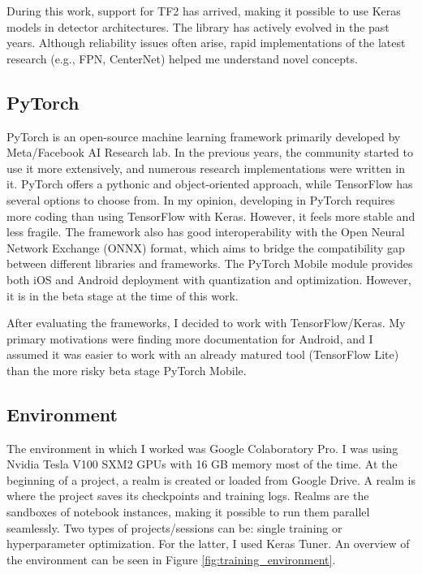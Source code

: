During this work, support for TF2 has arrived, making it possible to use Keras models in detector architectures. The library has actively evolved in the past years. Although reliability issues often arise, rapid implementations of the latest research (e.g., FPN, CenterNet) helped me understand novel concepts.

\subsection{PyTorch}

PyTorch\cite{PyTorch} is an open-source machine learning framework primarily developed by Meta/Facebook AI Research lab. In the previous years, the community started to use it more extensively, and numerous research implementations were written in it. PyTorch offers a pythonic and object-oriented approach, while TensorFlow has several options to choose from. In my opinion, developing in PyTorch requires more coding than using TensorFlow with Keras. However, it feels more stable and less fragile. The framework also has good interoperability with the Open Neural Network Exchange (ONNX)\cite{ONNX} format, which aims to bridge the compatibility gap between different libraries and frameworks. The PyTorch Mobile module provides both iOS and Android deployment with quantization and optimization. However, it is in the beta stage at the time of this work.

After evaluating the frameworks, I decided to work with TensorFlow/Keras. My primary motivations were finding more documentation for Android, and I assumed it was easier to work with an already matured tool (TensorFlow Lite) than the more risky beta stage PyTorch Mobile.

\subsection{Environment}

The environment in which I worked was Google Colaboratory Pro. I was using Nvidia Tesla V100 SXM2 GPUs with 16 GB memory most of the time. At the beginning of a project, a realm is created or loaded from Google Drive. A realm is where the project saves its checkpoints and training logs. Realms are the sandboxes of notebook instances, making it possible to run them parallel seamlessly. Two types of projects/sessions can be: single training or hyperparameter optimization. For the latter, I used Keras Tuner. An overview of the environment can be seen in Figure \ref{fig:training_environment}.

